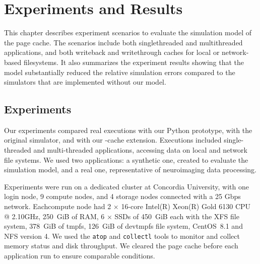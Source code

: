 \chapter{Experiments and Results}
\label{experiment}

This chapter describes experiment scenarios to evaluate the simulation model 
of the page cache. The scenarios include both singlethreaded and 
multithreaded applications, and both writeback and writethrough caches for 
local or network-based filesystems. 
It also summarizes the experiment results showing that the model 
substantially reduced the relative simulation errors compared to the 
simulators that are implemented without our model. 

\section{Experiments}

Our experiments compared real executions with our Python prototype, with the 
original \wrench simulator, and with our \wrench-cache extension. 
Executions included single-threaded and multi-threaded applications, 
accessing data on local and network file systems. 
We used two applications: a synthetic one, created to evaluate the simulation model, 
and a real one, representative of neuroimaging data processing.

Experiments were run on a dedicated cluster at Concordia University, with one 
login node, 9 compute nodes, and 4 storage nodes connected with a 25 Gbps network. 
Eachcompute node had 2 $\times$ 16-core Intel(R) Xeon(R) Gold 6130 CPU @ 2.10GHz, 
250~GiB of RAM, 6 $\times$ SSDs of 450~GiB each with the XFS file system, 
378~GiB of tmpfs, 126~GiB of devtmpfs file system, CentOS~8.1 and NFS version 4. 
We used the \texttt{atop} and \texttt{collectl} tools to monitor and collect memory status
and disk throughput. 
We cleared the page cache before each application run to ensure comparable conditions.
    
